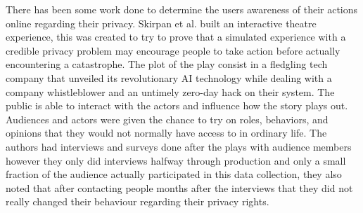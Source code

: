 \documentclass[conference]{IEEEtran}
\begin{document}
There has been some work done to determine the users awareness of
their actions online regarding their privacy. Skirpan et al. \cite{SkirpanPrivacy} built
an interactive theatre experience, this was created to try to prove that
a simulated experience with a credible privacy problem may encourage
people to take action before actually encountering a catastrophe.
The plot of the play consist in a fledgling tech company that unveiled
its revolutionary AI technology while dealing with a company whistleblower
and an untimely zero-day hack on their system. The public is able
to interact with the actors and influence how the story plays out.
Audiences and actors were given the chance to try on roles, behaviors,
and opinions that they would not normally have access to in ordinary life.
The authors had interviews and surveys done after the plays with
audience members however they only did interviews halfway through production
and only a small fraction of the audience actually participated in this
data collection, they also noted that after contacting people months
after the interviews that they did not really changed their behaviour
regarding their privacy rights.





\end{document}

